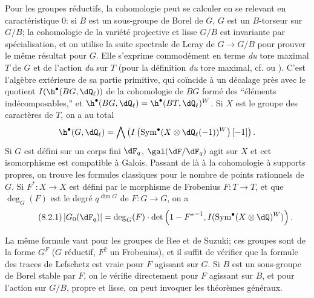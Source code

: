 Pour les groupes réductifs, la cohomologie peut se calculer en se relevant en 
caractéristique $0$: si $B$ est un sous-groupe de Borel de $G$, $G$ est un 
$B$-torseur sur $G/B$; la cohomologie de la variété projective et lisse 
$G/B$ est invariante par spécialisation, et on utilise la suite spectrale de 
Leray de $G\to G/B$ pour prouver le même résultat pour $G$. Elle s'exprime 
commodément en terme \emph{du} tore maximal $T$ de $G$ et de l'action 
\emph{du}  sur $T$ (pour la définition \emph{du} tore 
maximal, cf.  ou ). C'est 
l'algèbre extérieure de sa partie primitive, qui coïncide à un décalage 
près avec le quotient $I(\h^\bullet(B G,\dQ_\ell))$ de la cohomologie de 
$B G$ formé des ``éléments indécomposables,'' et 
$\h^\bullet(B G,\dQ_\ell)=\h^\bullet(B T,\dQ_\ell)^W$. Si $X$ est le groupe des 
caractères de $T$, on a au total 
\[
  \h^\bullet(G,\dQ_\ell) = \bigwedge \left(I\left(\operatorname{Sym}^\bullet(X\otimes \dQ_\ell(-1))^W\right)[-1]\right) \text{.}
\]
Si $G$ est défini sur un corps fini $\dF_q$, $\gal(\dF/\dF_q)$ agit sur $X$ 
et cet isomorphisme est compatible à Galois. Passant de là à la 
cohomologie à supports propres, on trouve les formules classiques pour le 
nombre de points rationnels de $G$. Si $F^\ast:X\to X$ est défini par le 
morphisme de Frobenius $F:T\to T$, et que $\deg_G(F)$ est le degré 
$q^{\dim G}$ de $F:G\to G$, on a 
\begin{equation*}\tag{8.2.1}\label{VI:eq:8-2-1}
  \left|G_0(\dF_q)\right| = \deg_G(F) \cdot \det\left(1-{F^\ast}^{-1},I(\operatorname{Sym}^\bullet(X\otimes \dQ)^W)\right) \text{.}
\end{equation*}

La même formule vaut pour les groupes de Ree et de Suzuki; ces groupes sont 
de la forme $G^F$ ($G$ réductif, $F^2$ un Frobenius), et il suffit de 
vérifier que la formule des traces de Lefschetz est vraie pour $F$ agissant 
sur $G$. Si $B$ est un sous-groupe de Borel stable par $F$, on le vérifie 
directement pour $F$ agissant sur $B$, et pour l'action sur $G/B$, propre et 
lisse, on peut invoquer les théorèmes généraux. 





\subsection{}\label{VI:8-3}

